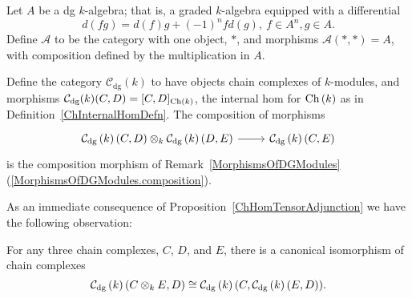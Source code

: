 \documentclass[dissertation.tex]{subfiles}
\begin{document}
\begin{eg}
  \begin{description}[style=nextline]
  \item[dg category with one object]
    Let $A$ be a dg $k$-algebra; that is, a graded $k$-algebra equipped with a differential
    $$d(fg) = d(f)g + (-1)^nfd(g),\ f \in A^n, g \in A.$$
    Define $\mathscr{A}$ to be the category with one object, $\ast$, and morphisms $\mathscr{A}(\ast, \ast) = A$, with composition defined by the multiplication in $A$.
  \item[dg $k$-modules]
    Define the category $\mathcal{C}_\text{dg}(k)$ to have objects chain complexes of $k$-modules, and morphisms $\mathcal{C}_\text{dg}(k)(C,D) = [C,D]_{\operatorname{Ch}\left(k\right)}$, the internal hom for $\operatorname{Ch}\left(k\right)$ as in Definition~\ref{ChInternalHomDefn}.
    The composition of morphisms
    $$\begin{tikzcd}
      \cdg{k}(C,D) \otimes_k \cdg{k}(D,E) \arrow{r} & \cdg{k}(C,E)
    \end{tikzcd}$$
    is the composition morphism of Remark~\ref{MorphismsOfDGModules} (\ref{MorphismsOfDGModules.composition}).
    
    As an immediate consequence of Proposition~\ref{ChHomTensorAdjunction} we have the following observation:
    \begin{prop}
      For any three chain complexes, $C$, $D$, and $E$, there is a canonical isomorphism of chain complexes
      $$\mathcal{C}_\text{dg}\left(k\right)(C \otimes_k E, D) \cong \mathcal{C}_\text{dg}\left(k\right)(C,\mathcal{C}_\text{dg}\left(k\right)(E,D)).$$
      

\end{prop}
\end{description}
\end{eg}
\end{document}
